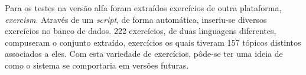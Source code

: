 Para os testes na versão alfa foram extraídos exercícios de outra plataforma, \emph{exercism}. Através de um \emph{script}, de forma automática, inseriu-se diversos exercícios no banco de dados. 222 exercícios, de duas linguagens diferentes, compuseram o conjunto extraído, exercícios os quais tiveram 157 tópicos distintos associados a eles. Com esta variedade de exercícios, pôde-se ter uma ideia de como o sistema se comportaria em versões futuras.
